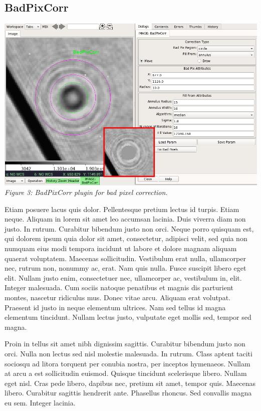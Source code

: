 \documentclass[]{article}
\begin{document}
\begin{multicols}{3}
\section*{BadPixCorr}

\para
\begin{center}
\includegraphics[width=8in]{plugin_badpixcorr.png}
\label{fig:plugin_badpixcorr}
\vspace*{0.4em}
{\small\em Figure 3: BadPixCorr plugin for bad pixel correction.}
\end{center}

\para
Etiam posuere lacus quis dolor. Pellentesque pretium lectus id
turpis. Etiam neque. Aliquam in lorem sit amet leo accumsan
lacinia. Duis viverra diam non justo. In rutrum. Curabitur bibendum
justo non orci. Neque porro quisquam est, qui dolorem ipsum quia dolor
sit amet, consectetur, adipisci velit, sed quia non numquam eius modi
tempora incidunt ut labore et dolore magnam aliquam quaerat
voluptatem. Maecenas sollicitudin. Vestibulum erat nulla, ullamcorper
nec, rutrum non, nonummy ac, erat. Nam quis nulla. Fusce suscipit libero
eget elit. Nullam justo enim, consectetuer nec, ullamcorper ac,
vestibulum in, elit. Integer malesuada. Cum sociis natoque penatibus et
magnis dis parturient montes, nascetur ridiculus mus. Donec vitae
arcu. Aliquam erat volutpat. Praesent id justo in neque elementum
ultrices. Nam sed tellus id magna elementum tincidunt. Nullam lectus
justo, vulputate eget mollis sed, tempor sed magna.

\para
Proin in tellus sit amet nibh dignissim sagittis. Curabitur bibendum
justo non orci. Nulla non lectus sed nisl molestie malesuada. In
rutrum. Class aptent taciti sociosqu ad litora torquent per conubia
nostra, per inceptos hymenaeos. Nullam at arcu a est sollicitudin
euismod. Quisque tincidunt scelerisque libero. Nullam eget nisl. Cras
pede libero, dapibus nec, pretium sit amet, tempor quis. Maecenas
libero. Curabitur sagittis hendrerit ante. Phasellus rhoncus. Sed
convallis magna eu sem. Integer lacinia.


\end{multicols}
\end{document}
